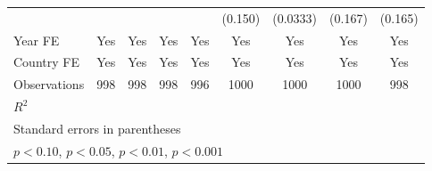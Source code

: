 \begin{table}[htbp]
\begin{tabular}{l*{8}{c}}
                &                  &                  &                  &                  &  (0.150)         & (0.0333)         &  (0.167)         &  (0.165)         \\
\addlinespace
Year FE         &      Yes         &      Yes         &      Yes         &      Yes         &      Yes         &      Yes         &      Yes         &      Yes         \\
\addlinespace
Country FE      &      Yes         &      Yes         &      Yes         &      Yes         &      Yes         &      Yes         &      Yes         &      Yes         \\
\midrule
Observations    &      998         &      998         &      998         &      996         &     1000         &     1000         &     1000         &      998         \\
\(R^{2}\)       &                  &                  &                  &                  &                  &                  &                  &                  \\
\bottomrule
\multicolumn{9}{l}{\footnotesize Standard errors in parentheses}\\
\multicolumn{9}{l}{\footnotesize \sym{+} \(p<0.10\), \sym{*} \(p<0.05\), \sym{**} \(p<0.01\), \sym{***} \(p<0.001\)}\\
\end{tabular}
\end{table}
